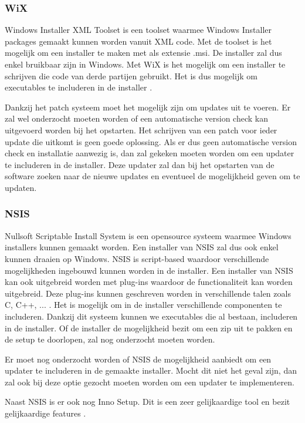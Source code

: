 \documentclass{article}
\begin{document}
\subsubsection{WiX \citep{wixMain}}
Windows Installer XML Toolset is een toolset waarmee Windows Installer packages gemaakt kunnen worden vanuit XML code.
Met de toolset is het mogelijk om een installer te maken met als extensie .msi.
De installer zal dus enkel bruikbaar zijn in Windows.
Met WiX is het mogelijk om een installer te schrijven die code van derde partijen gebruikt.
Het is dus mogelijk om executables te includeren in de installer \citep{wixMergers}.

Dankzij het patch systeem moet het mogelijk zijn om updates uit te voeren.
Er zal wel onderzocht moeten worden of een automatische version check kan uitgevoerd worden bij het opstarten.
Het schrijven van een patch voor ieder update die uitkomt is geen goede oplossing.
Als er dus geen automatische version check en installatie aanwezig is, dan zal gekeken moeten worden om een updater te includeren in de installer.
Deze updater zal dan bij het opstarten van de software zoeken naar de nieuwe updates en eventueel de mogelijkheid geven om te updaten.

\subsubsection{NSIS \citep{nsisMain}}
Nullsoft Scriptable Install System is een opensource systeem waarmee Windows installers kunnen gemaakt worden.
Een installer van NSIS zal dus ook enkel kunnen draaien op Windows.
NSIS is script-based waardoor verschillende mogelijkheden ingebouwd kunnen worden in de installer.
Een installer van NSIS kan ook uitgebreid worden met plug-ins waardoor de functionaliteit kan worden uitgebreid.
Deze plug-ins kunnen geschreven worden in verschillende talen zoals C, C++, ... \citep{nsisFeatures}.
Het is mogelijk om in de installer verschillende componenten te includeren.
Dankzij dit systeem kunnen we executables die al bestaan, includeren in de installer.
Of de installer de mogelijkheid bezit om een zip uit te pakken en de setup te doorlopen, zal nog onderzocht moeten worden.

Er moet nog onderzocht worden of NSIS de mogelijkheid aanbiedt om een updater te includeren in de gemaakte installer.
Mocht dit niet het geval zijn, dan zal ook bij deze optie gezocht moeten worden om een updater te implementeren.

Naast NSIS is er ook nog Inno Setup.
Dit is een zeer gelijkaardige tool en bezit gelijkaardige features \citep{innosetupMain}.
\end{document}
